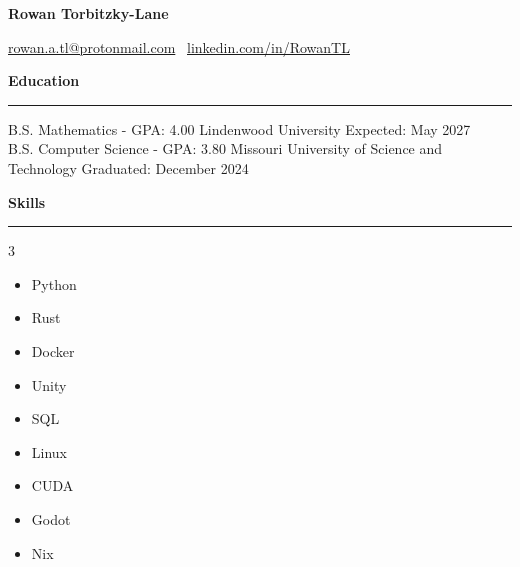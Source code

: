 \documentclass[11pt]{article}
\begin{document}
\begin{center}
    \textbf{\Huge Rowan Torbitzky-Lane}\\
    \hrulefill
\end{center}

\begin{center}
    \href{mailto:rowan.a.tl@protonmail.com}{rowan.a.tl@protonmail.com} \textbullet \ \href{https://www.linkedin.com/in/rowantl/}{linkedin.com/in/RowanTL}
\end{center}

\textbf{Education}\par
\vspace{-12pt}
\noindent\rule{\textwidth}{0.4pt}

B.S. Mathematics - GPA: 4.00 \tiny{Lindenwood University} \hfill \normalsize{Expected: May 2027} \\
B.S. Computer Science - GPA: 3.80 \tiny{Missouri University of Science and Technology} \hfill \normalsize{Graduated: December 2024}

\textbf{Skills}\par
\vspace{-12pt}
\noindent\rule{\textwidth}{0.4pt}
\vspace{-24pt}  %
\begin{multicols}{3}
    \begin{itemize}[noitemsep, topsep=0pt, partopsep=0pt, parsep=0pt, itemsep=0pt]
        \small
        \item Python
        \item Rust
        \item Docker
        \item Unity
        \item SQL
        \item Linux
        \item CUDA
        \item Godot
        \item Nix
    \end{itemize}
\end{multicols}
\vspace{-10pt}  %
\end{document}
